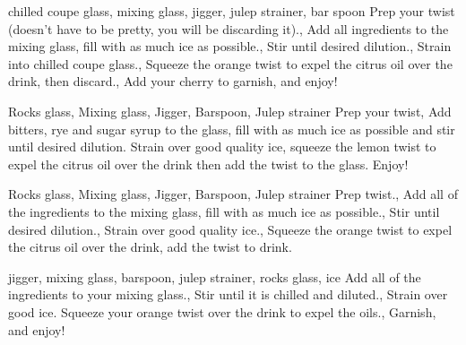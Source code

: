 \documentclass[../main.tex]{subfiles}
\begin{document}

{
	chilled coupe glass, mixing glass, jigger, julep strainer, bar spoon
}
{
	{Prep your twist (doesn’t have to be pretty, you will be discarding it).},
	{Add all ingredients to the mixing glass, fill with as much ice as possible.},
	{Stir until desired dilution.},
	{Strain into chilled coupe glass.},
	{Squeeze the orange twist to expel the citrus oil over the drink, then discard.},
	{Add your cherry to garnish, and enjoy!}
}

\cocktailDivider

{
	Rocks glass, Mixing glass, Jigger, Barspoon, Julep strainer
}
{
	Prep your twist,
	{Add bitters, rye and sugar syrup to the glass, fill with as much ice as possible and stir until desired dilution.}
		{Strain over good quality ice, squeeze the lemon twist to expel the citrus oil over the drink then add the twist to the glass. Enjoy!}
}

\newpage

{
	Rocks glass, Mixing glass, Jigger, Barspoon, Julep strainer
}
{
	{Prep twist.},
	{Add all of the ingredients to the mixing glass, fill with as much ice as possible.},
	{Stir until desired dilution.},
	{Strain over good quality ice.},
	{Squeeze the orange twist to expel the citrus oil over the drink, add the twist to
			drink.}
}

\cocktailDivider

{
	jigger, mixing glass, barspoon, julep strainer, rocks glass, ice
}
{
	Add all of the ingredients to your mixing glass.,
	Stir until it is chilled and diluted.,
	Strain over good ice.
	Squeeze your orange twist over the drink to expel the oils.,
	{Garnish, and enjoy!}
}
\end{document}
